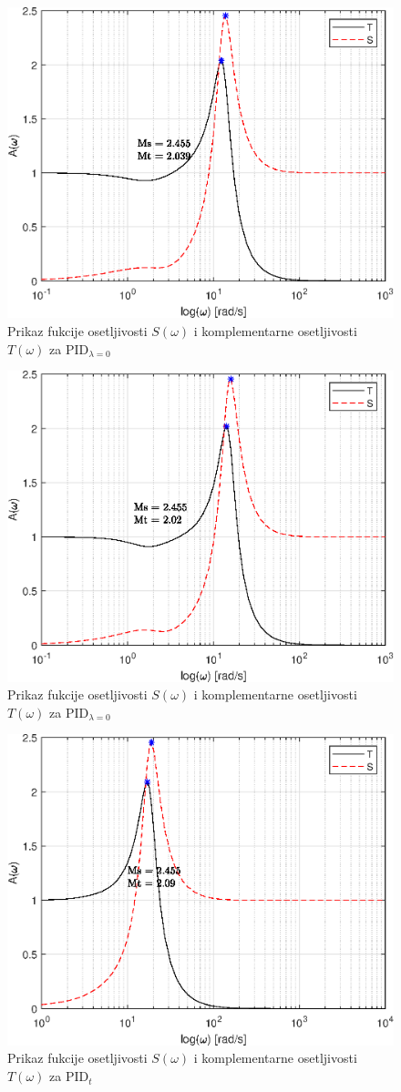 \documentclass[a4paper,11pt]{article}
\theoremstyle{definition} \newtheorem{deff}{Definicija}[section]
\theoremstyle{definition} \newtheorem{prim}[deff]{Primer}
\theoremstyle{plain} \newtheorem{teor}[deff]{Teorema}
\begin{document}
	\begin{figure}[!h]
		\centering
		\includegraphics[width=0.47\linewidth]{slike/Ms_Mt_pid.eps}
		\caption{Prikaz fukcije osetljivosti $S(\omega)$ i komplementarne osetljivosti $T(\omega)$ za PID$_{\lambda=0}$}
		\label{fig:MsMt_pid}
	\end{figure}
	
	\begin{figure}[!h]
		\centering
		\includegraphics[width=0.47\linewidth]{slike/Ms_Mt_pid_lam.eps}
		\caption{Prikaz fukcije osetljivosti $S(\omega)$ i komplementarne osetljivosti $T(\omega)$ za PID$_{\lambda=0}$}
		\label{fig:MsMt_pid_lam}
	\end{figure}
	
	\begin{figure}[!h]
		\centering
		\includegraphics[width=0.6\linewidth]{slike/Ms_Mt_pid_opt.eps}
		\caption{Prikaz fukcije osetljivosti $S(\omega)$ i komplementarne osetljivosti $T(\omega)$ za PID$_{t}$}
		\label{fig:MsMt_pid_opt}
	\end{figure}
	
\end{document}
